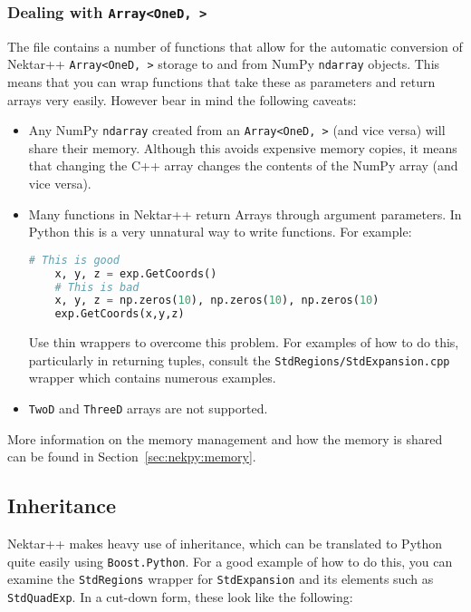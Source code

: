 \subsubsection{Dealing with \texttt{Array<OneD, >}}

The  file contains a number of functions that
allow for the automatic conversion of Nektar++ \texttt{Array<OneD, >} storage to and
from NumPy \texttt{ndarray} objects. This means that you can wrap functions that take
these as parameters and return arrays very easily. However bear in mind the
following caveats:

\begin{itemize}
  \item Any NumPy \texttt{ndarray} created from an \texttt{Array<OneD, >} (and
  vice versa) will share their memory. Although this avoids expensive memory
  copies, it means that changing the C++ array changes the contents of the NumPy
  array (and vice versa).
  \item Many functions in Nektar++ return Arrays through argument parameters. In
  Python this is a very unnatural way to write functions. For example:
  \begin{lstlisting}[language=Python]
    # This is good
    x, y, z = exp.GetCoords()
    # This is bad
    x, y, z = np.zeros(10), np.zeros(10), np.zeros(10)
    exp.GetCoords(x,y,z)
  \end{lstlisting}
  Use thin wrappers to overcome this problem. For examples of how to do this,
  particularly in returning tuples, consult the
  \texttt{StdRegions/StdExpansion.cpp} wrapper which contains numerous examples.
  \item \texttt{TwoD} and \texttt{ThreeD} arrays are not supported.
\end{itemize}

More information on the memory management and how the memory is shared can be
found in Section~\ref{sec:nekpy:memory}.

\subsection{Inheritance}

Nektar++ makes heavy use of inheritance, which can be translated to Python quite
easily using \texttt{Boost.Python}. For a good example of how to do this, you can
examine the \texttt{StdRegions} wrapper for \texttt{StdExpansion} and its elements such as
\texttt{StdQuadExp}. In a cut-down form, these look like the following:

